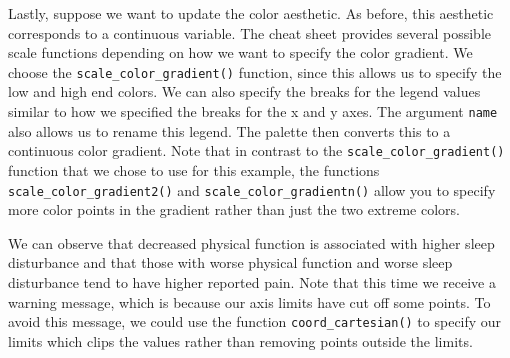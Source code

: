 \documentclass[
  letterpaper,
]{krantz}
\begin{document}
Lastly, suppose we want to update the color aesthetic. As before, this
aesthetic corresponds to a continuous variable. The cheat sheet provides
several possible scale functions depending on how we want to specify the
color gradient. We choose the \texttt{scale\_color\_gradient()}
function, since this allows us to specify the low and high end colors.
We can also specify the breaks for the legend values similar to how we
specified the breaks for the x and y axes. The argument \texttt{name}
also allows us to rename this legend. The palette then converts this to
a continuous color gradient. Note that in contrast to the
\texttt{scale\_color\_gradient()} function that we chose to use for this
example, the functions \texttt{scale\_color\_gradient2()} and
\texttt{scale\_color\_gradientn()} allow you to specify more color
points in the gradient rather than just the two extreme colors.

We can observe that decreased physical function is associated with
higher sleep disturbance and that those with worse physical function and
worse sleep disturbance tend to have higher reported pain. Note that
this time we receive a warning message, which is because our axis limits
have cut off some points. To avoid this message, we could use the
function \texttt{coord\_cartesian()} to specify our limits which clips
the values rather than removing points outside the limits.
\end{document}
